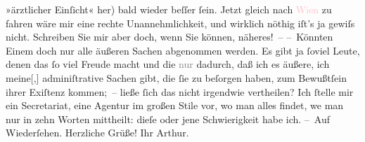                     »ärztlicher Einſicht« her) bald {\pb}wieder beſſer
                    ſein. Jetzt gleich nach \textcolor{pink}{Wien}{}\ledrightnote{\textcolor{pink}{Wien}} zu fahren wäre
                    mir eine rechte Unannehmlichkeit, und wirklich nöthig iſt’s ja gewiſs nicht.
                    Schreiben Sie mir aber doch, wenn Sie können, näheres! –\pend
           \pstart
           – Könnten Einem doch nur alle äußeren Sachen abgenommen werden. Es gibt ja ſoviel
                    Leute, denen das ſo viel Freude macht und die \textcolor{gray}{nur} dadurch,
                    daß ich es äußere, ich {\pb}meine{[},{]} adminiſtrative Sachen gibt, die ſie zu
                    beſorgen haben, zum Bewußtſein ihrer Exiſtenz kommen; – ließe ſich das
                    nicht irgendwie vertheilen? Ich ſtelle mir ein Secretariat, eine Agentur im
                    großen Stile vor, wo man alles findet, we{\geminationn} man nur
                    in zehn Worten mittheilt: dieſe oder jene Schwierigkeit habe ich.\pend
           \pstart – Auf Wiederſehen. Herzliche Grüße! Ihr \spacefill\mbox{Arthur.}\pend{}\endnumbering{}  
      